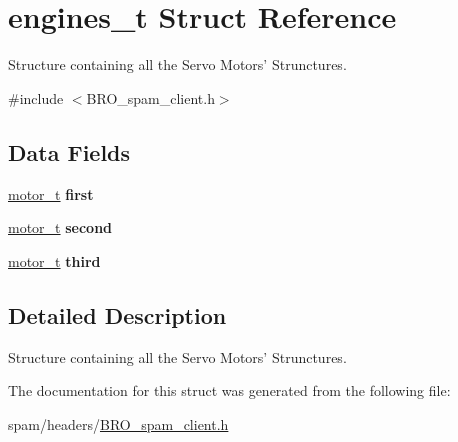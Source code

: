 \hypertarget{structengines__t}{
\section{engines\_\-t Struct Reference}
\label{structengines__t}
}


Structure containing all the Servo Motors' Strunctures.  




{\ttfamily \#include $<$BRO\_\-spam\_\-client.h$>$}

\subsection*{Data Fields}
\begin{DoxyCompactItemize}
\item 
\hypertarget{structengines__t_a39e4b2b646c7509643d14f6eb621e6a0}{
\hyperlink{structmotor__t}{motor\_\-t} {\bfseries first}}
\label{structengines__t_a39e4b2b646c7509643d14f6eb621e6a0}

\item 
\hypertarget{structengines__t_a0a7e050898c3cdb1a947fa45559bb408}{
\hyperlink{structmotor__t}{motor\_\-t} {\bfseries second}}
\label{structengines__t_a0a7e050898c3cdb1a947fa45559bb408}

\item 
\hypertarget{structengines__t_aacbb97e051cdd7241cced571c4086d44}{
\hyperlink{structmotor__t}{motor\_\-t} {\bfseries third}}
\label{structengines__t_aacbb97e051cdd7241cced571c4086d44}

\end{DoxyCompactItemize}


\subsection{Detailed Description}
Structure containing all the Servo Motors' Strunctures. 

The documentation for this struct was generated from the following file:\begin{DoxyCompactItemize}
\item 
spam/headers/\hyperlink{_b_r_o__spam__client_8h}{BRO\_\-spam\_\-client.h}\end{DoxyCompactItemize}
